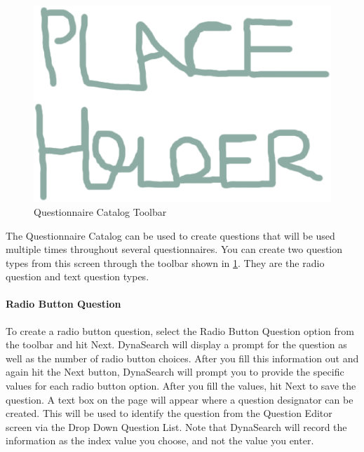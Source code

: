 \documentclass[article]{ij4uq}              %
\begin{document}
\begin{figure}[h!]
 \centering
 \includegraphics[width=5.0in]{figures/place.eps}
 \caption{Questionnaire Catalog Toolbar}
 \label{fig:questCatTool}
\end{figure}
\FloatBarrier

The Questionnaire Catalog can be used to create questions that will be used multiple times throughout several questionnaires. You can create two question types from this screen through the toolbar shown in \ref{fig:questCatTool}. They are the radio question and text question types.

\paragraph{Radio Button Question}
To create a radio button question, select the Radio Button Question option from the toolbar and hit Next. DynaSearch will display a prompt for the question as well as the number of radio button choices. After you fill this information out and again hit the Next button, DynaSearch will prompt you to provide the specific values for each radio button option. 
After you fill the values, hit Next to save the question. A text box on the page will appear where a question designator can be created. This will be used to identify the question from the Question Editor screen via the Drop Down Question List. 
Note that DynaSearch will record the information as the index value you choose, and not the value you enter.
\end{document}
